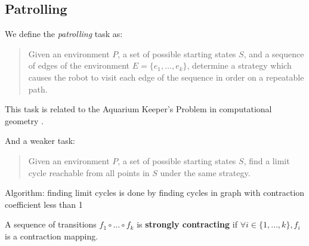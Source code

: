 \documentclass[]{styles/svproc}  %
\begin{document}
%
%


\subsection{Patrolling}

We define the \emph{patrolling} task as:

\begin{quotation}
Given an environment $P$, a set of possible starting states $S$, and
a sequence of edges of the environment $E = \{e_1, \ldots, e_k\}$,
determine a strategy which causes the robot to visit each edge of the sequence
in order on a repeatable path.
\end{quotation}

This task is related to the Aquarium Keeper's Problem in computational
geometry \cite{czyzowicz1991aquarium}.

And a weaker task:

\begin{quotation}
Given an environment $P$, a set of possible starting states $S$, find a limit
cycle reachable from all points in $S$ under the same strategy.
\end{quotation}

Algorithm: finding limit cycles is done by finding cycles in graph with
contraction coefficient less than 1

\begin{definition}
A sequence of transitions $f_1 \circ \ldots \circ f_k$ is \textbf{strongly
contracting} if $\forall i \in \{1, \ldots, k\}, f_i$ is a contraction mapping.
\end{definition}
\end{document}
